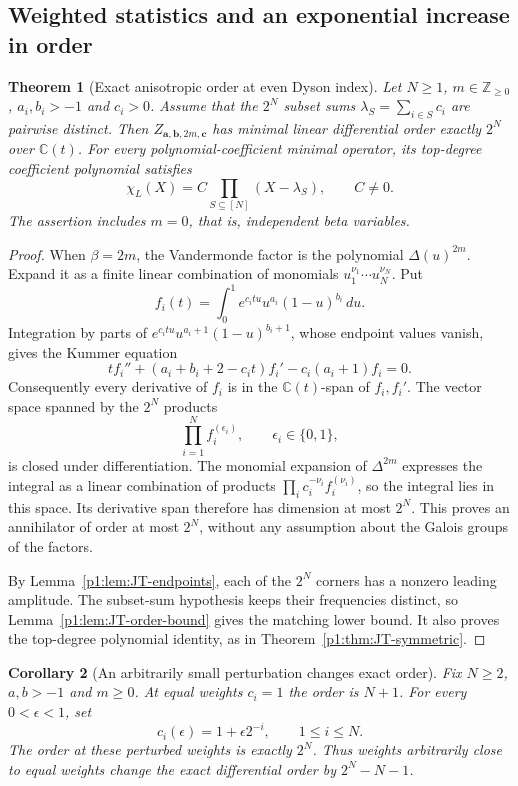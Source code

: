 \documentclass[11pt,a4paper]{article}
\newtheorem{theorem}{Theorem}[section]
\newtheorem{corollary}[theorem]{Corollary}
\theoremstyle{definition}
\theoremstyle{remark}
\numberwithin{equation}{section}
\begin{document}
\subsection{Weighted statistics and an exponential increase in order}

\begin{theorem}[Exact anisotropic order at even Dyson index]
\label{p1:thm:JT-anisotropic}
Let $N\ge1$, $m\in\mathbb Z_{\ge0}$, $a_i,b_i>-1$ and $c_i>0$.
Assume that the $2^N$ subset sums
$\lambda_S=\sum_{i\in S}c_i$ are pairwise distinct.
Then $Z_{\mathbf a,\mathbf b,2m,\mathbf c}$ has minimal linear
differential order exactly $2^N$ over $\mathbb C(t)$.
For every polynomial-coefficient minimal operator, its top-degree
coefficient polynomial satisfies
\[
 \chi_L(X)=C\prod_{S\subseteq[N]}(X-\lambda_S),\qquad C\ne0.
\]
The assertion includes $m=0$, that is, independent beta variables.
\end{theorem}

\begin{proof}
When $\beta=2m$, the Vandermonde factor is the polynomial
$\Delta(u)^{2m}$.  Expand it as a finite linear combination of
monomials $u_1^{\nu_1}\cdots u_N^{\nu_N}$.  Put
\[
 f_i(t)=\int_0^1 e^{c_i t u}u^{a_i}(1-u)^{b_i}\,du.
\]
Integration by parts of
$e^{c_i t u}u^{a_i+1}(1-u)^{b_i+1}$, whose endpoint values vanish,
gives the Kummer equation
\[
 t f_i''+(a_i+b_i+2-c_i t)f_i'-c_i(a_i+1)f_i=0.
\]
Consequently every derivative of $f_i$ is in the
$\mathbb C(t)$-span of $f_i,f_i'$.  The vector space spanned by
the $2^N$ products
\[
 \prod_{i=1}^N f_i^{(\epsilon_i)},\qquad \epsilon_i\in\{0,1\},
\]
is closed under differentiation.  The monomial expansion of
$\Delta^{2m}$ expresses the integral as a linear combination of
products $\prod_i c_i^{-\nu_i}f_i^{(\nu_i)}$, so the integral
lies in this space.  Its derivative span therefore has dimension
at most $2^N$.  This proves an annihilator of order at most $2^N$,
without any assumption about the Galois groups of the factors.

By Lemma~\ref{p1:lem:JT-endpoints}, each of the $2^N$ corners has a
nonzero leading amplitude.  The subset-sum hypothesis keeps their
frequencies distinct, so Lemma~\ref{p1:lem:JT-order-bound} gives the
matching lower bound.  It also proves the top-degree polynomial
identity, as in Theorem~\ref{p1:thm:JT-symmetric}.
\end{proof}

\begin{corollary}[An arbitrarily small perturbation changes exact order]
\label{p1:cor:JT-jump}
Fix $N\ge2$, $a,b>-1$ and $m\ge0$.  At equal weights $c_i=1$ the
order is $N+1$.  For every $0<\epsilon<1$, set
\[
 c_i(\epsilon)=1+\epsilon 2^{-i},\qquad 1\le i\le N.
\]
The order at these perturbed weights is exactly $2^N$.
Thus weights arbitrarily close to equal weights change the exact
differential order by $2^N-N-1$.
\end{corollary}
\end{document}
